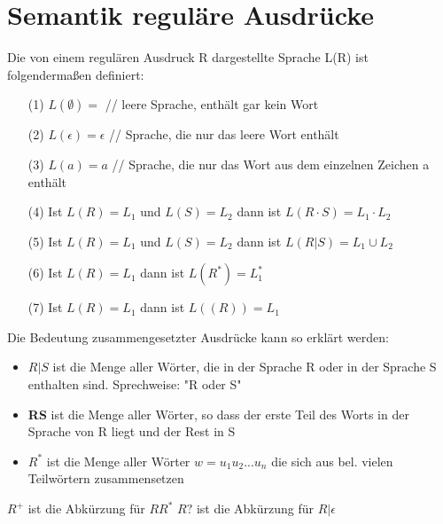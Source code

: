 \documentclass{scrreprt}
\begin{document}
\section{Semantik reguläre Ausdrücke}
Die von einem regulären Ausdruck R dargestellte Sprache L(R) ist folgendermaßen definiert:
\begin{itemize}
    \item [(1)] $L(\emptyset) = {}$ \hspace{1,6cm} // leere Sprache, enthält gar kein Wort
    \item [(2)] $L(\epsilon) = {\epsilon}$ \hspace{1,4cm} // Sprache, die nur das leere Wort enthält
    \item [(3)] $L(a) = {a}$ \hspace{1,3cm} // Sprache, die nur das Wort aus dem einzelnen Zeichen a enthält
    \item [(4)] Ist $L(R)=L_{1}$ und $L(S)=L_{2}$ dann ist $L(R \cdot S)=L_{1} \cdot L_{2}$
    \item [(5)] Ist $L(R)=L_{1}$ und $L(S)=L_{2}$ dann ist $L(R | S)=L_{1} \cup L_{2}$
    \item [(6)] Ist $L(R)=L_{1}$ dann ist $L(R^{*})=L_{1}^{*}$
    \item [(7)] Ist $L(R)=L_{1}$ dann ist $L((R))=L_{1}$
\end{itemize}
Die Bedeutung zusammengesetzter Ausdrücke kann so erklärt werden:
\begin{itemize}
    \item \textbf{$R|S$} ist die Menge aller Wörter, die in der Sprache R oder in der Sprache S enthalten sind.
    Sprechweise: "R oder S"
    \item \textbf{RS} ist die Menge aller Wörter, so dass der erste Teil des Worts in der Sprache von R liegt und der Rest in S
    \item \textbf{$R^{*}$} ist die Menge aller Wörter $w=u_{1}u_{2}...u_{n}$ die sich aus bel. vielen Teilwörtern zusammensetzen
\end{itemize}
\textbf{$R^{+}$} ist die Abkürzung für \textbf{$RR^{*}$}
\textbf{$R?$} ist die Abkürzung für \textbf{$R|\epsilon$}
\end{document}
